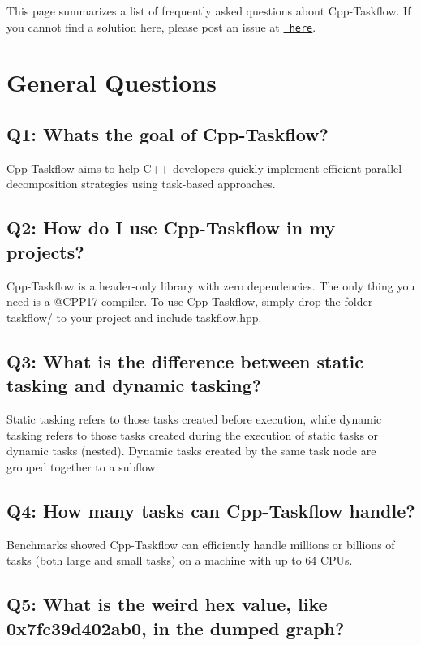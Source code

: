 This page summarizes a list of frequently asked questions about Cpp-\/\+Taskflow. If you cannot find a solution here, please post an issue at \href{https://github.com/cpp-taskflow/cpp-taskflow/issues}{\texttt{ here}}.\hypertarget{FAQ_GeneralQuestions}{}\section{General Questions}\label{FAQ_GeneralQuestions}
\hypertarget{FAQ_GeneralQuestion1}{}\subsection{Q1\+: What\textquotesingle{}s the goal of Cpp-\/\+Taskflow?}\label{FAQ_GeneralQuestion1}
Cpp-\/\+Taskflow aims to help C++ developers quickly implement efficient parallel decomposition strategies using task-\/based approaches.\hypertarget{FAQ_GeneralQuestion2}{}\subsection{Q2\+: How do I use Cpp-\/\+Taskflow in my projects?}\label{FAQ_GeneralQuestion2}
Cpp-\/\+Taskflow is a header-\/only library with zero dependencies. The only thing you need is a @\+C\+P\+P17 compiler. To use Cpp-\/\+Taskflow, simply drop the folder {\ttfamily taskflow/} to your project and include taskflow.\+hpp.\hypertarget{FAQ_GeneralQuestion3}{}\subsection{Q3\+: What is the difference between static tasking and dynamic tasking?}\label{FAQ_GeneralQuestion3}
Static tasking refers to those tasks created before execution, while dynamic tasking refers to those tasks created during the execution of static tasks or dynamic tasks (nested). Dynamic tasks created by the same task node are grouped together to a subflow.\hypertarget{FAQ_GeneralQuestion4}{}\subsection{Q4\+: How many tasks can Cpp-\/\+Taskflow handle?}\label{FAQ_GeneralQuestion4}
Benchmarks showed Cpp-\/\+Taskflow can efficiently handle millions or billions of tasks (both large and small tasks) on a machine with up to 64 C\+P\+Us.\hypertarget{FAQ_GeneralQuestion5}{}\subsection{Q5\+: What is the weird hex value, like 0x7fc39d402ab0, in the dumped graph?}\label{FAQ_GeneralQuestion5}
